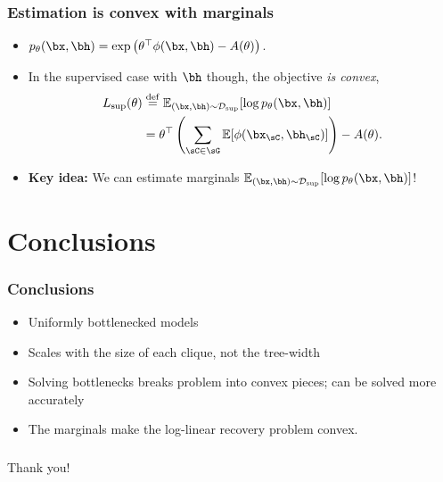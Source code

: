 \documentclass[xcolor={svgnames}]{beamer}
\begin{document}
\begin{frame}
  \frametitle{Estimation is convex with marginals}
  \begin{itemize}
    \item<1-> $p_\theta(\bx, \bh) = \exp\left( \theta^\top \phi(\bx,\bh) - A(\theta) \right)$.
      \item<1-> In the supervised case with $\bh$ though, the objective {\em is convex},
        \begin{align*}
        \label{eqn:logLinearSupervised}
        L_\text{sup}(\theta) &\eqdef \E_{(\bx,\bh) \sim \sD_\text{sup}}[\log p_\theta(\bx,\bh)] \\
                             &= \theta^\top \left(\sum_{\sC \in \sG} \E[\phi(\bx_\sC,\bh_\sC)]\right) - A(\theta).
        \end{align*}
      \item<2-> {\bf Key idea:} We can estimate marginals $\E_{(\bx,\bh) \sim \sD_\text{sup}}[\log p_\theta(\bx,\bh)]$!
  \end{itemize}
\end{frame}

\section{Conclusions}

\begin{frame}
  \frametitle{Conclusions}
  \begin{itemize}
      \item Uniformly bottlenecked models
      \item Scales with the size of each clique, not the tree-width
      \item Solving bottlenecks breaks problem into convex pieces; can be solved more accurately
      \item The marginals make the log-linear recovery problem convex.
  \end{itemize}
\end{frame}

\begin{frame}
  \frametitle{}
    Thank you!
\end{frame}
\end{document}

